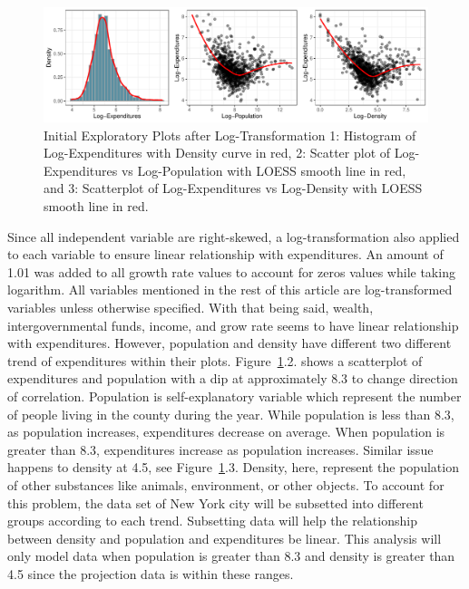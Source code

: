 \documentclass[11pt]{article}\usepackage[]{graphicx}\usepackage[]{color}
\makeatletter
\def\maxwidth{ %
  \ifdim\Gin@nat@width>\linewidth
    \linewidth
  \else
    \Gin@nat@width
  \fi
}
\makeatother
\begin{document}
\begin{figure}[h!] 
\begin{center}

\includegraphics[width=\maxwidth]{figure/unnamed-chunk-1-1} 

\caption{Initial Exploratory Plots after Log-Transformation 1: Histogram of Log-Expenditures with Density curve in red, 2: Scatter plot of Log-Expenditures vs Log-Population with LOESS smooth line in red, and 3: Scatterplot of Log-Expenditures vs Log-Density with LOESS smooth line in red.}
\label{inital-explore}
\end{center} 
\end{figure}

\noindent Since all independent variable are right-skewed, a log-transformation also applied to each variable to ensure linear relationship with expenditures. An amount of 1.01 was added to all growth rate values to account for zeros values while taking logarithm. All variables mentioned in the rest of this article are log-transformed variables unless otherwise specified. With that being said, wealth, intergovernmental funds, income, and grow rate seems to have linear relationship with expenditures. However, population and density have different two different trend of expenditures within their plots. Figure~\ref{inital-explore}.2. shows a scatterplot of expenditures and population with a dip at approximately 8.3 to change direction of correlation. Population is self-explanatory variable which represent the number of people living in the county during the year. While population is less than 8.3, as population increases, expenditures decrease on average. When population is greater than 8.3, expenditures increase as population increases. Similar issue happens to density at 4.5, see Figure~\ref{inital-explore}.3. Density, here, represent the population of other substances like animals, environment, or other objects. To account for this problem, the data set of New York city will be subsetted into different groups according to each trend. Subsetting data will help the relationship between density and population and expenditures be linear. This analysis will only model data when population is greater than 8.3 and density is greater than 4.5 since the projection data is within these ranges.    
\end{document}
